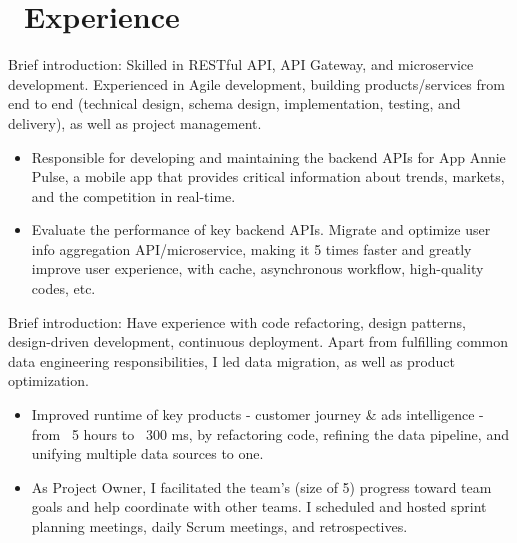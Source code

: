 \documentclass{resume}
\begin{document}



\section{\faUsers\ Experience}
\role{Web Backend Engineer}
Brief introduction: Skilled in RESTful API, API Gateway, and microservice development. Experienced in Agile development, building products/services from end to end (technical design, schema design, implementation, testing, and delivery), as well as project management.
\begin{itemize}
  \item Responsible for developing and maintaining the backend APIs for App Annie Pulse, a mobile app that provides critical information about trends, markets, and the competition in real-time.
  \item Evaluate the performance of key backend APIs. Migrate and optimize user info aggregation API/microservice, making it 5 times faster and greatly improve user experience, with cache, asynchronous workflow, high-quality codes, etc.
\end{itemize}

Brief introduction: Have experience with code refactoring, design patterns, design-driven development, continuous deployment. Apart from fulfilling common data engineering responsibilities, I led data migration, as well as product optimization.
\begin{itemize}
  \item Improved runtime of key products - customer journey & ads intelligence - from ~5 hours to ~300 ms, by refactoring code, refining the data pipeline, and unifying multiple data sources to one. 
  \item As Project Owner, I facilitated the team’s (size of 5) progress toward team goals and help coordinate with other teams. I scheduled and hosted sprint planning meetings, daily Scrum meetings, and retrospectives.
\end{itemize}
\end{document}
